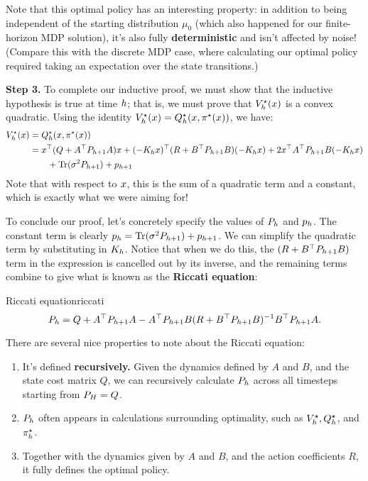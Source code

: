 \documentclass[\main/main]{subfiles}
\begin{document}
Note that this optimal policy has an interesting property: in addition to being
independent of the starting distribution $\mu_0$ (which also happened for our
finite-horizon MDP solution), it's also fully \textbf{deterministic} and isn't affected by noise!
(Compare this with the discrete MDP case, where calculating our optimal policy
required taking an expectation over the state transitions.)

\textbf{Step 3.} To complete our inductive proof, we must show that the
inductive hypothesis is true at time $h$; that is, we must prove that
$V^\star_h(x)$ is a convex quadratic.
Using the identity $V^\star_h(x) = Q^\star_h(x, \pi^\star(x))$, we have: \begin{align*}
    V^\star_h(x) &= Q^\star_h(x, \pi^\star(x)) \\
    &= x^\top (Q + A^\top P_{h+1} A) x + (-K_h x)^\top (R + B^\top P_{h+1} B) (-K_h x)
    + 2x^\top A^\top P_{h+1} B (-K_h x) \\
        &\qquad + \operatorname*{\textrm{Tr}}(\sigma^2 P_{h+1}) + p_{h+1}
\end{align*}
Note that with respect to $x$, this is the sum of a quadratic term and a constant,
which is exactly what we were aiming for!

To conclude our proof, let's concretely specify the values of $P_h$ and $p_h$.
The constant term is clearly $p_h = \operatorname*{\textrm{Tr}}(\sigma^2 P_{h+1}) + p_{h+1}$.
We can simplify the quadratic term by substituting in $K_h$.
Notice that when we do this, the $(R+B^\top P_{h+1} B)$ term in
the expression is cancelled out by its inverse, and the remaining terms combine to give
what is known as the \textbf{Riccati equation}:

\begin{definition}{Riccati equation}{riccati}
    \[
        P_h = Q + A^\top P_{h+1} A - A^\top P_{h+1} B (R + B^\top P_{h+1} B)^{-1} B^\top P_{h+1} A.
    \]
\end{definition}

There are several nice properties to note about the Riccati equation:
\begin{enumerate}
    \item It's defined \textbf{recursively.} Given the dynamics defined by $A$ and $B$, and the state cost matrix $Q$, we can
    recursively calculate $P_h$ across all timesteps starting from $P_H = Q$.
    \item $P_h$ often appears in calculations surrounding optimality, such as $V^\star_h, Q^\star_h$, and $\pi^\star_h$.
    \item Together with the dynamics given by $A$ and $B$, and the action coefficients $R$, it fully defines the optimal policy.
\end{enumerate}
\end{document}
